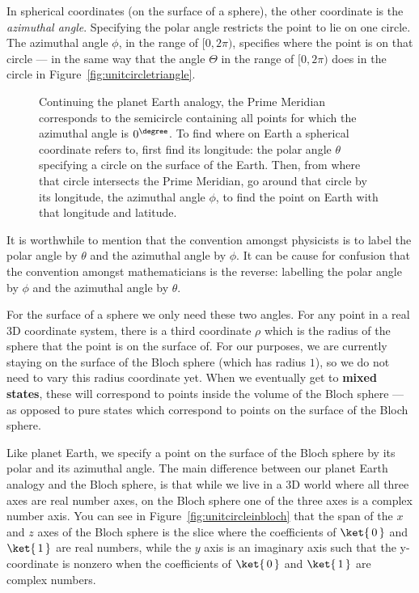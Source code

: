 \documentclass{article}
\def\tikzscale{1.5}
\theoremstyle{definition}
\newcommand{\kz}[1]{\ket{\,#1\,}}
\begin{document}
In spherical coordinates (on the surface of a sphere), the other coordinate is the \textit{azimuthal angle}.  Specifying the polar angle restricts the point to lie on one circle.  The azimuthal angle $\phi$, in the range of $[0,2\pi)$, specifies where the point is on that circle --- in the same way that the angle $\Theta$ in the range of $[0,2\pi)$ does in the circle in Figure~\ref{fig:unitcircletriangle}.
\begin{figure}[H]
	\centering
	\scalebox{\tikzscale}{\tikzfig{latitude}}
	\caption{Continuing the planet Earth analogy, the Prime Meridian corresponds to the semicircle containing all points for which the azimuthal angle is $0^{\degree}$.  To find where on Earth a spherical coordinate refers to, first find its longitude: the polar angle $\theta$ specifying a circle on the surface of the Earth.  Then, from where that circle intersects the Prime Meridian, go around that circle by its longitude, the azimuthal angle $\phi$, to find the point on Earth with that longitude and latitude.}
\end{figure}
It is worthwhile to mention that the convention amongst physicists is to label the polar angle by $\theta$ and the azimuthal angle by $\phi$.  It can be cause for confusion that the convention amongst mathematicians is the reverse: labelling the polar angle by $\phi$ and the azimuthal angle by $\theta$.

For the surface of a sphere we only need these two angles.  For any point in a real 3D coordinate system, there is a third coordinate $\rho$ which is the radius of the sphere that the point is on the surface of.  For our purposes, we are currently staying on the surface of the Bloch sphere (which has radius $1$), so we do not need to vary this radius coordinate yet.  When we eventually get to \textbf{mixed states}, these will correspond to points inside the volume of the Bloch sphere --- as opposed to pure states which correspond to points on the surface of the Bloch sphere.

Like planet Earth, we specify a point on the surface of the Bloch sphere by its polar and its azimuthal angle.  The main difference between our planet Earth analogy and the Bloch sphere, is that while we live in a 3D world where all three axes are real number axes, on the Bloch sphere one of the three axes is a complex number axis.  You can see in Figure~\ref{fig:unitcircleinbloch} that the span of the $x$ and $z$ axes of the Bloch sphere is the slice where the coefficients of $\kz0$ and $\kz1$ are real numbers, while the $y$ axis is an imaginary axis such that the y-coordinate is nonzero when the coefficients of $\kz0$ and $\kz1$ are complex numbers.
\end{document}
